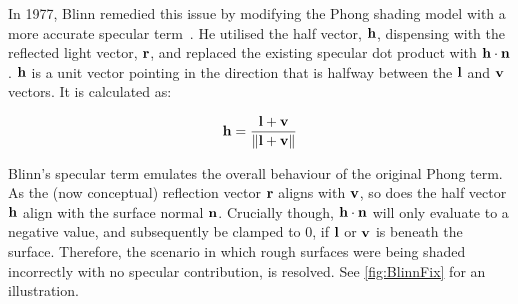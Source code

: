 In 1977, Blinn remedied this issue by modifying the Phong shading model with a more accurate specular term~\cite{BlinnModelsOfLightReflection}. He utilised the half vector, \begin{math}\mathbf{h}\end{math}, dispensing with the reflected light vector, \begin{math}\mathbf{r}\end{math}, and replaced the existing specular dot product with \begin{math}\mathbf{h}\cdot\mathbf{n}\end{math}. \begin{math}\mathbf{h}\end{math} is a unit vector pointing in the direction that is halfway between the \begin{math}\mathbf{l}\end{math} and \begin{math}\mathbf{v}\end{math} vectors. It is calculated as:

\begin{equation}
	\mathbf{h} = \frac{\mathbf{l} + \mathbf{v}}{\norm{\mathbf{l} + \mathbf{v}}}
\end{equation}

Blinn's specular term emulates the overall behaviour of the original Phong term. As the (now conceptual) reflection vector \begin{math}\mathbf{r}\end{math} aligns with \begin{math}\mathbf{v}\end{math}, so does the half vector \begin{math}\mathbf{h}\end{math} align with the surface normal \begin{math}\mathbf{n}\end{math}. Crucially though, \begin{math}\mathbf{h}\cdot\mathbf{n}\end{math} will only evaluate to a negative value, and subsequently be clamped to 0, if \begin{math}\mathbf{l}\end{math} or \begin{math}\mathbf{v}\end{math} is beneath the surface. Therefore, the scenario in which rough surfaces were being shaded incorrectly with no specular contribution, is resolved. See \ref{fig:BlinnFix} for an illustration.

